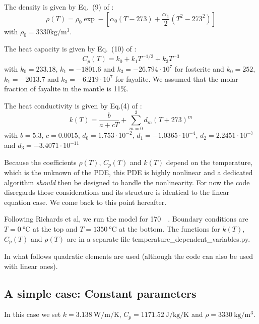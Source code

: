 The density is given by Eq.~(9) of \textcite{mcjp05}:
\begin{equation}
\rho(T)=\rho_0 \exp -\left[\alpha_0 (T-273) + \frac{\alpha_1}{2} (T^2-273^2) \right]
\label{eq:f83_1}
\end{equation}
with $\rho_0=3330\si{\kg\per\cubic\meter}$.

The heat capacity is given by Eq.~(10) of \textcite{mcjp05}:
\begin{equation}
C_p(T) = k_0 + k_1 T^{-1/2} + k_3 T^{-3}
\label{eq:f83_2}
\end{equation}
with $k_0=233.18$, $k_1=-1801.6$ and $k_3=-26.794\cdot 10^{7}$ for fosterite and 
$k_0=252$, $k_1=-2013.7$ and $k_3=-6.219\cdot10^{7}$ for fayalite. We assumed that the
molar fraction of fayalite in the mantle is 11\%. 

The heat conductivity is given by Eq.(4) of \textcite{mcjp05}:
\begin{equation}
k(T)=\frac{b}{a+cT} + \sum_{m=0}^3 d_m (T+273)^m
\label{eq:f83_3}
\end{equation}
with $b=5.3$, $c=0.0015$, $d_0=1.753\cdot10^{-2}$, $d_1=-1.0365\cdot10^{-4}$, $d_2=2.2451\cdot10^{-7}$ and 
$d_3=-3.4071\cdot10^{-11}$

Because the coefficients $\rho(T)$, $C_p(T)$ and $k(T)$ depend on the temperature, which is the unknown 
of the PDE, this PDE is highly nonlinear and a dedicated algorithm {\it should} then 
be designed to handle the nonlinearity. For now the code disregards those considerations 
and its structure is identical to the linear equation case. 
We come back to this point hereafter.

Following Richards et al, we run the model for 170~\si{\mega\year}. 
Boundary conditions are $T=0~\si{\celsius}$ 
at the top and $T=1350~\si{\celsius}$ at the bottom. The functions for $k(T)$, $C_p(T)$ and $\rho(T)$
are in a separate file {\python temperature\_dependent\_variables.py}.

In what follows quadratic elements are used (although the code can also be used with linear ones).

\subsection*{A simple case: Constant parameters}

In this case we set $k=3.138~\si{\watt\per\meter\per\kelvin}$, 
$C_p=1171.52~\si{\joule\per\kg\per\kelvin}$ and 
$\rho=3330~\si{\kg\per\cubic\meter}$.

